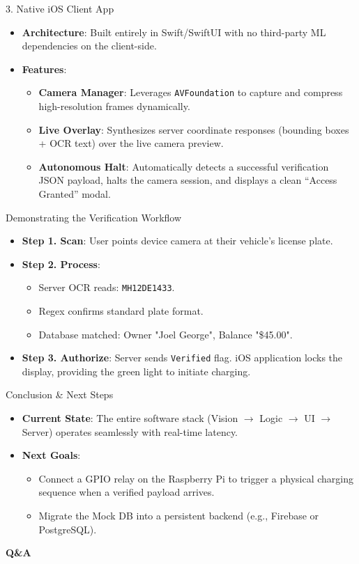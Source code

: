 \documentclass{beamer}
\begin{document}
\begin{frame}{3. Native iOS Client App}
    \begin{itemize}
        \item \textbf{Architecture}: Built entirely in Swift/SwiftUI with no third-party ML dependencies on the client-side.
        \item \textbf{Features}:
        \begin{itemize}
            \item \textbf{Camera Manager}: Leverages \texttt{AVFoundation} to capture and compress high-resolution frames dynamically.
            \item \textbf{Live Overlay}: Synthesizes server coordinate responses (bounding boxes + OCR text) over the live camera preview.
            \item \textbf{Autonomous Halt}: Automatically detects a successful verification JSON payload, halts the camera session, and displays a clean ``Access Granted'' modal.
        \end{itemize}
    \end{itemize}
\end{frame}

\begin{frame}{Demonstrating the Verification Workflow}
    \begin{itemize}
        \item \textbf{Step 1. Scan}: User points device camera at their vehicle's license plate.
        \item \textbf{Step 2. Process}: 
            \begin{itemize}
                \item Server OCR reads: \texttt{MH12DE1433}.
                \item Regex confirms standard plate format.
                \item Database matched: Owner "Joel George", Balance "\$45.00".
            \end{itemize}
        \item \textbf{Step 3. Authorize}: Server sends \texttt{Verified} flag. iOS application locks the display, providing the green light to initiate charging.
    \end{itemize}
\end{frame}

\begin{frame}{Conclusion \& Next Steps}
    \begin{itemize}
        \item \textbf{Current State}: The entire software stack (Vision $\to$ Logic $\to$ UI $\to$ Server) operates seamlessly with real-time latency.
        \item \textbf{Next Goals}:
        \begin{itemize}
            \item Connect a GPIO relay on the Raspberry Pi to trigger a physical charging sequence when a verified payload arrives.
            \item Migrate the Mock DB into a persistent backend (e.g., Firebase or PostgreSQL).
        \end{itemize}
    \end{itemize}
\end{frame}

\begin{frame}
    \centering \Huge \textbf{Q\&A}
\end{frame}
\end{document}
